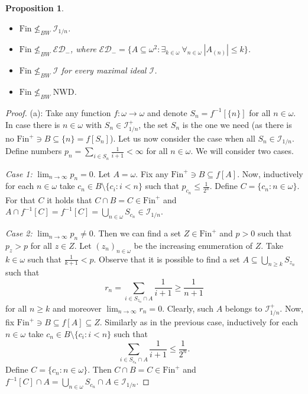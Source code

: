 \documentclass{amsart}
\theoremstyle{plain}
\newtheorem{proposition}[theorem]{Proposition}
\theoremstyle{definition}
\theoremstyle{remark}
\newcommand{\cI}{\mathcal{I}}
\newcommand{\I}{\cI}
\newcommand{\fin}{\mathrm{Fin}}
\newcommand{\Fin}{\mathrm{Fin}}
\newcommand{\ED}{\mathcal{ED}}
\newcommand{\nwd}{\mathrm{NWD}}
\begin{document}
\begin{proposition}\
\label{prop:idealy_nie_powyzej_Fin}
\begin{itemize}
    \item[(a)] $\Fin\not\leq_{BW}\I_{1/n}$. 
    \item[(b)] $\Fin\not\leq_{BW}\ED_-$, where $\ED_-=\{A\subseteq\omega^2: \exists_{k\in\omega}\ \forall_{n\in\omega}\ |A_{(n)}|\leq k\}$. 
    \item[(c)] $\Fin\not\leq_{BW}\I$ for every maximal ideal $\I$. 
    \item[(d)] $\Fin\not\leq_{BW}\nwd$.
\end{itemize}
\end{proposition}

\begin{proof}
(a): Take any function $f : \omega\rightarrow \omega$ and denote $S_n= f^{-1}[\{n\}]$ for all $n \in \omega$. In case there is $n \in \omega$ with $S_n\in \I_{1/n}^+ $, the set $S_n$ is the one we need (as there is no $\Fin^+\ni B\subseteq \{n\}=f[S_n]$). Let us now consider the case when all $S_n \in \I_{1/n}$. Define numbers $p_n= \sum_{i \in S_n}\frac{1}{i+1}<\infty$ for all $n \in \omega$. We will consider two cases. 

\smallskip

\textit{Case 1:} $\lim_{n \rightarrow \infty} p_n=0$. Let $A=\omega$. Fix any $\Fin^+ \ni B\subseteq f[A]$. Now, inductively for each $n\in\omega$ take $c_n\in B\setminus\{c_i:i<n\}$ such that $p_{c_n} \leq \frac{1}{2^n}$. Define $C=\{ c_n:n\in\omega \}$. For that $C$ it holds that $C\cap B=C \in \fin^+$ and $A\cap f^{-1}[C]=f^{-1}[C]=\bigcup_{n\in\omega}S_{c_n}\in \I_{1/n}$.

\smallskip

\textit{Case 2:} $\lim_{n \rightarrow\infty}p_n \neq 0$. Then we can find a set $Z\in\Fin^+$ and $p>0$ such that $p_{z}>p$ for all $z\in Z$. Let $(z_n)_{n\in\omega}$ be the increasing enumeration of $Z$. Take $k\in\omega$ such that $\frac{1}{k+1}<p$. Observe that it is possible to find a set $A\subseteq\bigcup_{n \geq k}S_{z_n}$ such that  $$r_n=\sum_{i \in S_{z_{n}}\cap A}\frac{1}{i+1}\geq \frac{1}{n+1}$$ for all $n \geq k$ and moreover $\lim_{n \to \infty}r_n=0$. Clearly, such $A$ belongs to $\I^+_{1/n}$. Now, fix $\fin^+\ni B\subseteq f[A]\subseteq Z$. Similarly as in the previous case, inductively for each $n \in \omega$ take $c_n\in B\setminus\{c_i:i<n\}$ such that $$\sum_{i \in S_{c_n}\cap A}\frac{1}{i+1}\leq \frac{1}{2^n}\text{.}$$ Define $C=\{c_n:n \in\omega\}$. Then $C\cap B=C \in \fin^+$ and $f^{-1}[C]\cap A =\bigcup_{n \in \omega}S_{c_n} \cap A \in \I_{1/n}$. 


\end{proof}
\end{document}
